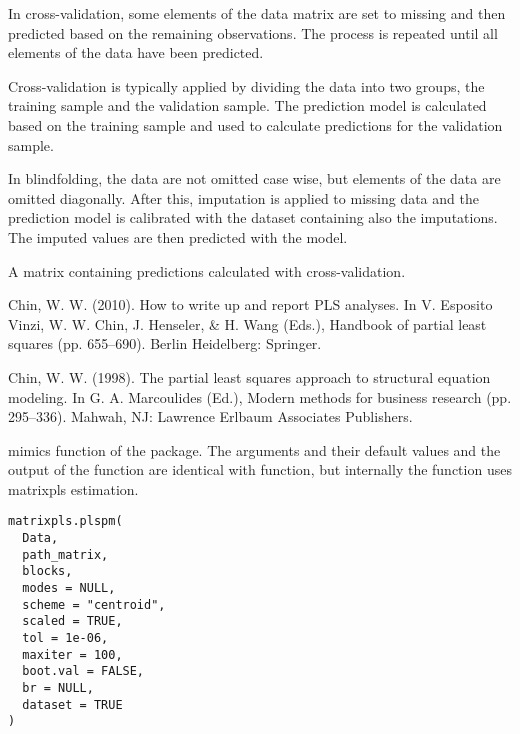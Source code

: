 \documentclass[a4paper]{book}
\begin{document}
%
\begin{Details}\relax
In cross-validation, some elements of the data matrix are set to missing and then
predicted based on the remaining observations. The process is repeated until all elements
of the data have been predicted. 

Cross-validation is typically applied by dividing the data into two groups, the training
sample and the validation sample. The prediction model is calculated based on the 
training sample and used to calculate predictions for the validation sample.

In blindfolding, the data are not omitted case wise, but elements of the data are omitted
diagonally. After this, imputation is applied to missing data and the prediction model
is calibrated with the dataset containing also the imputations. The imputed values are then 
predicted with the model.
\end{Details}
%
\begin{Value}
A matrix containing predictions calculated with cross-validation.
\end{Value}
%
\begin{References}\relax
Chin, W. W. (2010). How to write up and report PLS analyses. In V. Esposito Vinzi, W. W. Chin, J.
Henseler, \& H. Wang (Eds.), Handbook of partial least squares (pp. 655–690). Berlin Heidelberg: Springer.

Chin, W. W. (1998). The partial least squares approach to structural equation modeling. 
In G. A. Marcoulides (Ed.), Modern methods for business research (pp. 295–336). 
Mahwah, NJ: Lawrence Erlbaum Associates Publishers.
\end{References}
%
\begin{Description}\relax
{} mimics  function of the  package.
The arguments and their default values and the output of the function are identical with  function,
but internally the function uses matrixpls estimation.
\end{Description}
%
\begin{Usage}
\begin{verbatim}
matrixpls.plspm(
  Data,
  path_matrix,
  blocks,
  modes = NULL,
  scheme = "centroid",
  scaled = TRUE,
  tol = 1e-06,
  maxiter = 100,
  boot.val = FALSE,
  br = NULL,
  dataset = TRUE
)
\end{verbatim}
\end{Usage}
\end{document}
